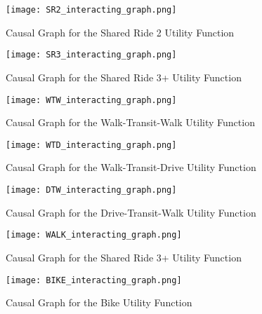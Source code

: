 \begin{figure}
   \centering
   \texttt{[image: SR2\_interacting\_graph.png]}
   \caption{Causal Graph for the Shared Ride 2 Utility Function}
   \label{fig:SR2_causal_2}
\end{figure}

\begin{figure}
   \centering
   \texttt{[image: SR3\_interacting\_graph.png]}
   \caption{Causal Graph for the Shared Ride 3+ Utility Function}
   \label{fig:SR3_causal_2}
\end{figure}

\begin{figure}
   \centering
   \texttt{[image: WTW\_interacting\_graph.png]}
   \caption{Causal Graph for the Walk-Transit-Walk Utility Function}
   \label{fig:WTW_causal_2}
\end{figure}

\begin{figure}
   \centering
   \texttt{[image: WTD\_interacting\_graph.png]}
   \caption{Causal Graph for the Walk-Transit-Drive Utility Function}
   \label{fig:WTD_causal_2}
\end{figure}

\begin{figure}
   \centering
   \texttt{[image: DTW\_interacting\_graph.png]}
   \caption{Causal Graph for the Drive-Transit-Walk Utility Function}
   \label{fig:DTW_causal_2}
\end{figure}

\begin{figure}
   \centering
   \texttt{[image: WALK\_interacting\_graph.png]}
   \caption{Causal Graph for the Shared Ride 3+ Utility Function}
   \label{fig:WALK_causal_2}
\end{figure}

\begin{figure}
   \centering
   \texttt{[image: BIKE\_interacting\_graph.png]}
   \caption{Causal Graph for the Bike Utility Function}
   \label{fig:BIKE_causal_2}
\end{figure}

